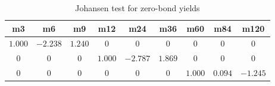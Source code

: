 \begin{table}[!htbp]
    \begin{center}
    \begin{tabular}{|ccccccccc|}
    \hline
    {m3}&{m6}&{m9}&{m12}&{m24}&{m36}&{m60}&{m84}&{m120}\tabularnewline
    \hline
    $1.000$&$-2.238$&$1.240$&$0$&$0$&$0$&$0$&$0$&$0$ \tabularnewline
    \hline
    $0$&$0$&$0$&$1.000$&$-2.787$&$1.869$&$0$&$0$&$0$ \tabularnewline
    \hline
    $0$&$0$&$0$&$0$&$0$&$0$&$1.000$&$0.094$&$-1.245$ \tabularnewline
    \hline
    \end{tabular}\end{center}
    \caption{Johansen test for zero-bond yields}
    \label{tab:johansenTest}
    \end{table}